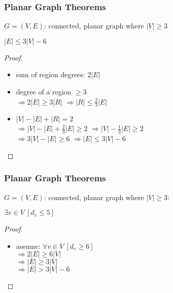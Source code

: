 \documentclass[dvipsnames]{beamer}
\begin{document}
\begin{frame}
  \frametitle{Planar Graph Theorems}

  \begin{theorem}
    $G=(V,E)$: connected, planar graph where $|V| \geq 3$

    $|E| \leq 3 |V| - 6$
  \end{theorem}

  \pause
  \begin{proof}
    \begin{itemize}
      \item sum of region degrees: $2 |E|$

      \pause
      \item degree of a region $\geq 3$\\
        \pause
        $\Rightarrow 2 |E| \geq 3 |R|$
        \pause
        $\Rightarrow |R| \leq \frac{2}{3} |E|$

      \pause
      \item $|V| - |E| + |R| = 2$\\
        \pause
        $\Rightarrow |V| - |E| + \frac{2}{3} |E| \geq 2$
        \pause
        $\Rightarrow |V| - \frac{1}{3} |E| \geq 2$\\
        \pause
        $\Rightarrow 3 |V| - |E| \geq 6$
        \pause
        $\Rightarrow |E| \leq 3 |V| - 6$\\
    \end{itemize}
  \end{proof}
\end{frame}

\begin{frame}
  \frametitle{Planar Graph Theorems}

  \begin{theorem}
    $G=(V,E)$: connected, planar graph where $|V| \geq 3$:

    $\exists v \in V~[d_v \leq 5]$
  \end{theorem}

  \pause
  \begin{proof}
    \begin{itemize}
      \item assume: $\forall v \in V~[d_v \geq 6]$\\
        \pause
        $\Rightarrow 2 |E| \geq 6 |V|$\\
        \pause
        $\Rightarrow |E| \geq 3 |V|$\\
        \pause
        $\Rightarrow |E| > 3 |V| - 6$
    \end{itemize}
  \end{proof}
\end{frame}
\end{document}
